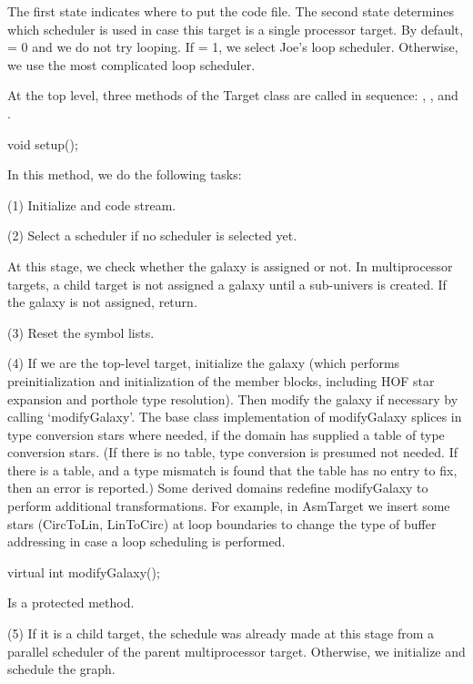The first state indicates where to put the code file. The second state
determines which scheduler is used in case this target is a single
processor target. By default,  = 0 and we do not
try looping. If  = 1, we select Joe's loop scheduler.
Otherwise, we use the most complicated loop scheduler.

At the top level, three methods of the Target class are called in sequence:
, , and . 

\begin{example}
void setup();
\end{example}

In this method, we do the following tasks:

(1) Initialize  and  code stream.

(2) Select a scheduler if no scheduler is selected yet.

At this stage, we check whether the galaxy is assigned or not. In
multiprocessor targets, a child target is not assigned a galaxy until
a sub-univers is created. If the galaxy is not assigned, return.

(3) Reset the symbol lists.

(4) If we are the top-level target, initialize the galaxy (which performs
preinitialization and initialization of the member blocks, including HOF star
expansion and porthole type resolution).  Then modify the galaxy if necessary
by calling `modifyGalaxy'.  The base class implementation of modifyGalaxy
splices in type conversion stars where needed, if the domain has supplied a
table of type conversion stars.  (If there is no table, type conversion is
presumed not needed.  If there is a table, and a type mismatch is found that
the table has no entry to fix, then an error is reported.)  Some derived
domains redefine modifyGalaxy to perform additional transformations.  For
example, in AsmTarget we insert some stars (CircToLin, LinToCirc) at loop
boundaries to change the type of buffer addressing in case a loop scheduling
is performed.

\begin{example}
virtual int modifyGalaxy();
\end{example}

Is a protected method.

(5) If it is a child target, the schedule was already made at this stage
from a parallel scheduler of the parent multiprocessor target. Otherwise,
we initialize and schedule the graph.

